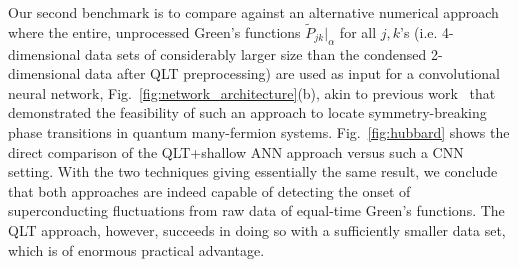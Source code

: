 \documentclass[amsmath,amssymb, aps, prx, longbibliography, twocolumn]{revtex4-1}
\begin{document}
%
Our second benchmark is to compare against an alternative numerical approach where the entire, unprocessed Green's functions 
$\widetilde{P}_{jk}|_{\alpha}$ for all $j,k$'s (i.e. 4-dimensional data sets of considerably larger size than the condensed 2-dimensional data after QLT preprocessing) are used as input for a convolutional neural network, Fig.~\ref{fig:network_architecture}(b), akin to previous work~\cite{Simon2016} that demonstrated the feasibility of such an approach to  locate symmetry-breaking phase transitions in quantum many-fermion systems. 
Fig.~\ref{fig:hubbard} shows the direct comparison of the QLT+shallow ANN approach versus such a CNN setting. With the two techniques giving essentially the same result, we conclude that  both approaches are indeed capable of detecting the onset of superconducting fluctuations from raw data of equal-time Green's functions. The QLT approach, however, succeeds in doing so with a sufficiently smaller data set, which is of enormous practical advantage.
\end{document}
